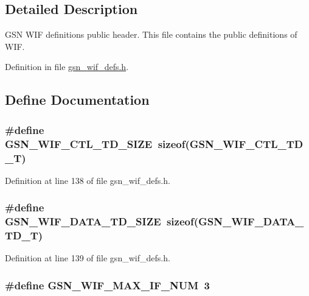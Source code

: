 \subsection{Detailed Description}
GSN WIF definitions public header. This file contains the public definitions of WIF. 

Definition in file \hyperlink{a00610_source}{gsn\_\-wif\_\-defs.h}.



\subsection{Define Documentation}
\hypertarget{a00610_ad58fc93b48c98eed4245b922b60b9398}{
\subsubsection[{GSN\_\-WIF\_\-CTL\_\-TD\_\-SIZE}]{\setlength{\rightskip}{0pt plus 5cm}\#define GSN\_\-WIF\_\-CTL\_\-TD\_\-SIZE~sizeof({\bf GSN\_\-WIF\_\-CTL\_\-TD\_\-T})}}
\label{a00610_ad58fc93b48c98eed4245b922b60b9398}


Definition at line 138 of file gsn\_\-wif\_\-defs.h.

\hypertarget{a00610_a2a36db8c9237847322be3065c9ed0aa3}{
\subsubsection[{GSN\_\-WIF\_\-DATA\_\-TD\_\-SIZE}]{\setlength{\rightskip}{0pt plus 5cm}\#define GSN\_\-WIF\_\-DATA\_\-TD\_\-SIZE~sizeof({\bf GSN\_\-WIF\_\-DATA\_\-TD\_\-T})}}
\label{a00610_a2a36db8c9237847322be3065c9ed0aa3}


Definition at line 139 of file gsn\_\-wif\_\-defs.h.

\hypertarget{a00610_a227770e4a8a8653b7e1335fbe857bf83}{
\subsubsection[{GSN\_\-WIF\_\-MAX\_\-IF\_\-NUM}]{\setlength{\rightskip}{0pt plus 5cm}\#define GSN\_\-WIF\_\-MAX\_\-IF\_\-NUM~3}}
\label{a00610_a227770e4a8a8653b7e1335fbe857bf83}



